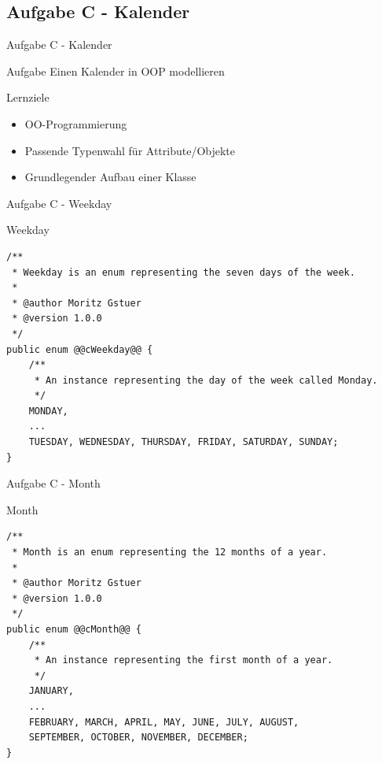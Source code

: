 \documentclass[aspectratio=169]{beamer}
\begin{document}
\subsection{Aufgabe C - Kalender}

\begin{frame}{Aufgabe C - Kalender}
  \begin{block}{Aufgabe}
    \pause
    Einen Kalender in OOP modellieren
  \end{block}

  \pause
  \begin{block}{Lernziele}
    \begin{itemize}
      \item OO-Programmierung
      \pause
      \item Passende Typenwahl für Attribute/Objekte
      \pause
      \item Grundlegender Aufbau einer Klasse
    \end{itemize}
  \end{block}
\end{frame}

\begin{frame}[fragile]{Aufgabe C - Weekday}
  \begin{block}{Weekday}
    \begin{lstlisting}
/**
 * Weekday is an enum representing the seven days of the week.
 *
 * @author Moritz Gstuer
 * @version 1.0.0
 */
public enum @@cWeekday@@ {
    /**
     * An instance representing the day of the week called Monday.
     */
    MONDAY,
    ...
    TUESDAY, WEDNESDAY, THURSDAY, FRIDAY, SATURDAY, SUNDAY;
}
    \end{lstlisting}
  \end{block}
\end{frame}

\begin{frame}[fragile]{Aufgabe C - Month}
  \begin{block}{Month}
    \begin{lstlisting}
/**
 * Month is an enum representing the 12 months of a year.
 *
 * @author Moritz Gstuer
 * @version 1.0.0
 */
public enum @@cMonth@@ {
    /**
     * An instance representing the first month of a year.
     */
    JANUARY,
    ...
    FEBRUARY, MARCH, APRIL, MAY, JUNE, JULY, AUGUST,
    SEPTEMBER, OCTOBER, NOVEMBER, DECEMBER;
}
    \end{lstlisting}
  \end{block}
\end{frame}
\end{document}

